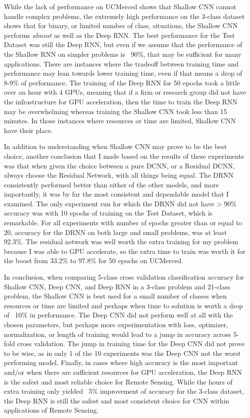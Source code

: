 \documentclass[12pt]{article}
\begin{document}
	While the lack of performance on UCMerced shows that Shallow CNN cannot handle complex problems, the extremely high performance on the 3-class dataset shows that for binary, or limited number of class, situations, the Shallow CNN performs \textit{almost} as well as the Deep RNN. The best performance for the Test Dataset was still the Deep RNN, but even if we assume that the performance of the Shallow RNN on simpler problems is ~90\%, that may be sufficient for many applications. There are instances where the tradeoff between training time and performance may lean towards lower training time, even if that means a drop of 8-9\% of performance. The training of the Deep RNN for 50 epochs took a little over an hour with 4 GPUs, meaning that if a firm or research group did not have the infrastructure for GPU acceleration, then the time to train the Deep RNN may be overwhelming whereas training the Shallow CNN took less than 15 minutes. In those instances where resources or time are limited, Shallow CNN have their place. 
	
	In addition to understanding when Shallow CNN may prove to be the best choice, another conclusion that I made based on the results of these experiments was that when given the choice between a pure DCNN, or a Residual DCNN, always choose the Residual Network, with all things being equal. The DRNN consistently performed better than either of the other models, and more importantly, it was by far the most consistent and dependable model that I examined. The only experiment run for which the DRNN did not have > 90\% accuracy was with 10 epochs of training on the Test Dataset, which is remarkable. For all experiments with number of epochs greater than or equal to 20, accuracy for the DRNN on both large and small problems, was at least 92.3\%. The residual network was well worth the extra training for my problem because I was able to GPU accelerate, so the extra time to train was worth it for the boost from 33.2\% to 97.8\% for 50 epochs on UCMerced. 
	
	In conclusion, when comparing 5-class cross validation classification accuracy for Shallow CNN, Deep CNN, and Deep RNN in a 3-class problem and 21-class problem, the Shallow CNN is best used for a small number of classes when resources or time are limited and perhaps when time to solution is worth a drop of ~10\% in performance. The Deep CNN did not perform well at all with the chosen parameters, but perhaps more experimentation with loss, optimizer, normalization, or length of training would lead to a jump in accuracy across 5-fold cross validation. The jump in training time for the Deep CNN did not prove to be wise, as in only 1 of the 10 experiments was the Deep CNN not the worst performing model. Finally, in cases where high accuracy is the most important and/or when there are sufficient resources for GPU acceleration, the Deep RNN is the safest and most reliable choice for Remote Sensing. While the hours of extra training only yielded ~5\% improvement of accuracy for the 3-class dataset, the Deep RNN is still the safest and most consistent choice for CNN within applications of Remote Sensing. 
	
\end{document}
